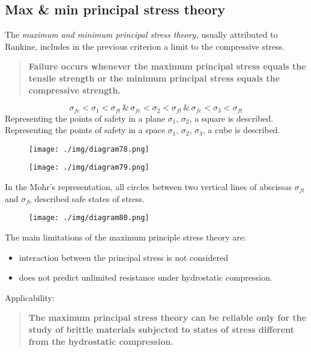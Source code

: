 \subsection{Max \& min principal stress theory}
The \textit{maximum and minimum principal stress theory,} usually attributed to Rankine, includes in the previous criterion a limit to the compressive stress.
\begin{quotation}
  \textbf{Failure occurs whenever the maximum principal stress equals the tensile strength or the minimum principal stress equals the compressive strength.}
\end{quotation}
\begin{equation}
  \sigma_{fc} < \sigma_1 < \sigma_{ft} \, \& \, \sigma_{fc} < \sigma_2 < \sigma_{ft} \, \& \, \sigma_{fc} < \sigma_3 < \sigma_{ft}
\end{equation}
Representing the points of safety in a plane $\sigma_1$, $\sigma_2$, a square is described. Representing the points of safety in a space $\sigma_1$, $\sigma_2$, $\sigma_3$, a cube is described.
\begin{figure}
  \begin{center}
    \begin{minipage}[b]{0.46\textwidth}
      \centering
      \texttt{[image: ./img/diagram78.png]}
      \caption{}
    \end{minipage}
    \begin{minipage}[b]{0.46\textwidth}
      \centering
      \texttt{[image: ./img/diagram79.png]}
      \caption{}
    \end{minipage}
  \end{center}
\end{figure}
In the Mohr's representation, all circles between two vertical lines of abscissas $\sigma_{ft}$ and $\sigma_{fc}$ described safe states of stress.
\begin{figure}[H]
  \centering
  \texttt{[image: ./img/diagram80.png]}
  \caption{}
\end{figure}
The main limitations of the maximum principle stress theory are:
\begin{itemize}
  \item interaction between the principal stress is not considered
  \item does not predict unlimited resistance under hydrostatic compression.
\end{itemize}
Applicability:
\begin{quotation}
  \textbf{The maximum principal stress theory can be reliable only for the study of brittle materials subjected to states of stress different from the hydrostatic compression.}
\end{quotation}
